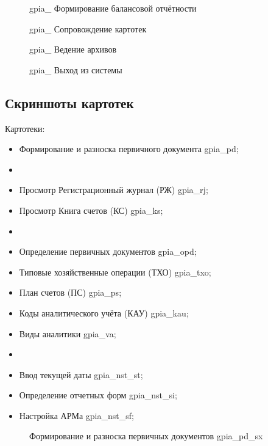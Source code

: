 \begin{figure}[!htb]
    \centering
    \caption{gpia\_ Формирование балансовой отчётности}
\end{figure}

\begin{figure}[!htb]
    \centering
    \caption{gpia\_ Сопровождение картотек}
\end{figure}

\begin{figure}[!htb]
    \centering
    \caption{gpia\_ Ведение архивов}
\end{figure}

\begin{figure}[!htb]
    \centering
    \caption{gpia\_ Выход из системы}
\end{figure}

\newpage

\subsection{Скриншоты картотек}

Картотеки:

\begin{itemize}
\item Формирование и разноска первичного документа gpia\_pd;
\item[] \hspace{0pt}
\item Просмотр Регистрационный журнал (РЖ) gpia\_rj;
\item Просмотр Книга счетов (КС) gpia\_ks;
\item[] \hspace{0pt}
\item Определение первичных документов gpia\_opd;
\item Типовые хозяйственные операции (ТХО) gpia\_txo;
\item План счетов (ПС) gpia\_ps;
\item Коды аналитического учёта (КАУ) gpia\_kau;
\item Виды аналитики gpia\_va;
\item[] \hspace{0pt}
\item Ввод текущей даты gpia\_nst\_st;
\item Определение отчетных форм gpia\_nst\_si;
\item Настройка АРМа gpia\_nst\_sf;
\end{itemize}

\begin{figure}[!htb]
    \centering
    \caption{Формирование и разноска первичных документов gpia\_pd\_sx}
    \label{fig:gpia_pd_sx}
\end{figure}

